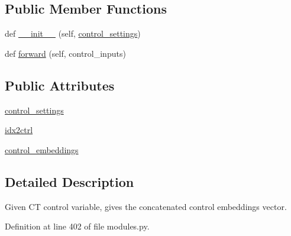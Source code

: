 \subsection*{Public Member Functions}
\begin{DoxyCompactItemize}
\item 
def \hyperlink{classprojects_1_1controllable__dialogue_1_1controllable__seq2seq_1_1modules_1_1ControlEncoder_ab8dcfaae2104f26275f8ab019492066a}{\+\_\+\+\_\+init\+\_\+\+\_\+} (self, \hyperlink{classprojects_1_1controllable__dialogue_1_1controllable__seq2seq_1_1modules_1_1ControlEncoder_adbbe77bd38eeb87b6b36c0ef388a5436}{control\+\_\+settings})
\item 
def \hyperlink{classprojects_1_1controllable__dialogue_1_1controllable__seq2seq_1_1modules_1_1ControlEncoder_ac2bef67897aca9040ff155659c786059}{forward} (self, control\+\_\+inputs)
\end{DoxyCompactItemize}
\subsection*{Public Attributes}
\begin{DoxyCompactItemize}
\item 
\hyperlink{classprojects_1_1controllable__dialogue_1_1controllable__seq2seq_1_1modules_1_1ControlEncoder_adbbe77bd38eeb87b6b36c0ef388a5436}{control\+\_\+settings}
\item 
\hyperlink{classprojects_1_1controllable__dialogue_1_1controllable__seq2seq_1_1modules_1_1ControlEncoder_af757a0435f54ad1db6f1ada3bb6f7921}{idx2ctrl}
\item 
\hyperlink{classprojects_1_1controllable__dialogue_1_1controllable__seq2seq_1_1modules_1_1ControlEncoder_a4935c48c23d2a7d4fcddbdb32d8e9ce6}{control\+\_\+embeddings}
\end{DoxyCompactItemize}


\subsection{Detailed Description}
\begin{DoxyVerb}Given CT control variable, gives the concatenated control embeddings vector.
\end{DoxyVerb}
 

Definition at line 402 of file modules.\+py.



